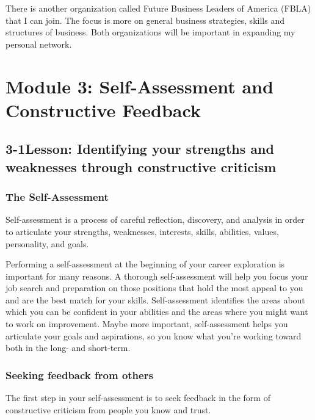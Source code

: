 There is another organization called Future Business Leaders of America (FBLA) that I can join. The focus is more on general business strategies, skills and structures of business. Both organizations will be important in expanding my personal network.

\pagebreak \section*{Module 3:	Self-Assessment and Constructive Feedback}
\noindent\makebox[\textwidth]{\rule{\linewidth}{0.4pt}} 
\localtableofcontents
\noindent\makebox[\textwidth]{\rule{\linewidth}{0.4pt}}

\pagebreak \subsection*{3-1\quad Lesson: Identifying your strengths and weaknesses through constructive criticism}
\subsubsection*{The Self-Assessment}
Self-assessment is a process of careful reflection, discovery, and analysis in order to articulate your strengths, weaknesses, interests, skills, abilities, values, personality, and goals.

Performing a self-assessment at the beginning of your career exploration is important for many reasons. A thorough self-assessment will help you focus your job search and preparation on those positions that hold the most appeal to you and are the best match for your skills. Self-assessment identifies the areas about which you can be confident in your abilities and the areas where you might want to work on improvement. Maybe more important, self-assessment helps you articulate your goals and aspirations, so you know what you're working toward both in the long- and short-term.

\subsubsection*{Seeking feedback from others}
The first step in your self-assessment is to seek feedback in the form of constructive criticism from people you know and trust.

